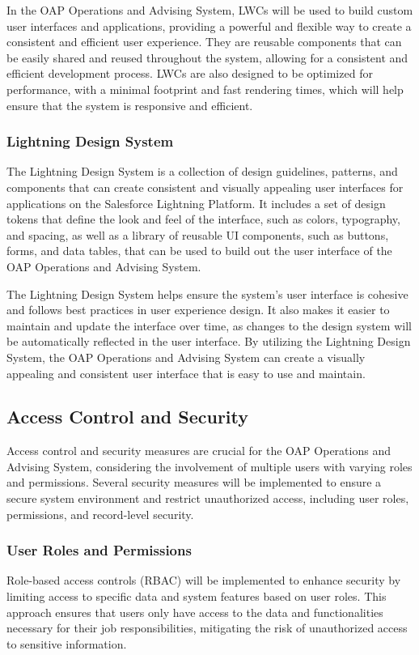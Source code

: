 \documentclass[12pt]{article}
\begin{document}
In the OAP Operations and Advising System, LWCs will be used to build custom user interfaces and applications, providing a powerful and flexible way to create a consistent and efficient user experience. They are reusable components that can be easily shared and reused throughout the system, allowing for a consistent and efficient development process. LWCs are also designed to be optimized for performance, with a minimal footprint and fast rendering times, which will help ensure that the system is responsive and efficient.

\subsubsection{Lightning Design System}
The Lightning Design System is a collection of design guidelines, patterns, and components that can create consistent and visually appealing user interfaces for applications on the Salesforce Lightning Platform. It includes a set of design tokens that define the look and feel of the interface, such as colors, typography, and spacing, as well as a library of reusable UI components, such as buttons, forms, and data tables, that can be used to build out the user interface of the OAP Operations and Advising System.

The Lightning Design System helps ensure the system's user interface is cohesive and follows best practices in user experience design. It also makes it easier to maintain and update the interface over time, as changes to the design system will be automatically reflected in the user interface. By utilizing the Lightning Design System, the OAP Operations and Advising System can create a visually appealing and consistent user interface that is easy to use and maintain.

\subsection{Access Control and Security}
Access control and security measures are crucial for the OAP Operations and Advising System, considering the involvement of multiple users with varying roles and permissions. Several security measures will be implemented to ensure a secure system environment and restrict unauthorized access, including user roles, permissions, and record-level security.

\subsubsection{User Roles and Permissions}
Role-based access controls (RBAC) will be implemented to enhance security by limiting access to specific data and system features based on user roles. This approach ensures that users only have access to the data and functionalities necessary for their job responsibilities, mitigating the risk of unauthorized access to sensitive information.
\end{document}
